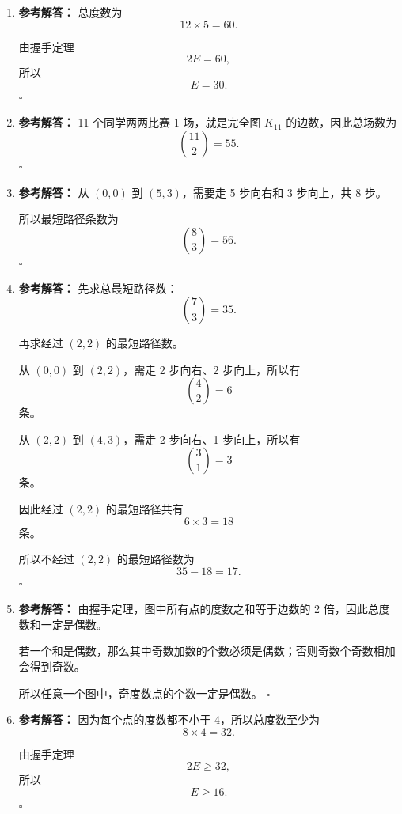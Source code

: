 \documentclass[11pt,a4paper,fontset=fandol]{ctexart}
\newenvironment{solution}{\par\noindent\textbf{参考解答：}}{\hfill$\square$\par}
\begin{document}
\begin{enumerate}
  \item \begin{solution}
  总度数为
  \[
  12\times 5=60.
  \]

  由握手定理
  \[
  2E=60,
  \]
  所以
  \[
  E=30.
  \]
  \end{solution}

  \item \begin{solution}
  11 个同学两两比赛 1 场，就是完全图 $K_{11}$ 的边数，因此总场数为
  \[
  \binom{11}{2}=55.
  \]
  \end{solution}

  \item \begin{solution}
  从 $(0,0)$ 到 $(5,3)$，需要走 5 步向右和 3 步向上，共 8 步。

  所以最短路径条数为
  \[
  \binom83=56.
  \]
  \end{solution}

  \item \begin{solution}
  先求总最短路径数：
  \[
  \binom73=35.
  \]

  再求经过 $(2,2)$ 的最短路径数。

  从 $(0,0)$ 到 $(2,2)$，需走 2 步向右、2 步向上，所以有
  \[
  \binom42=6
  \]
  条。

  从 $(2,2)$ 到 $(4,3)$，需走 2 步向右、1 步向上，所以有
  \[
  \binom31=3
  \]
  条。

  因此经过 $(2,2)$ 的最短路径共有
  \[
  6\times 3=18
  \]
  条。

  所以不经过 $(2,2)$ 的最短路径数为
  \[
  35-18=17.
  \]
  \end{solution}

  \item \begin{solution}
  由握手定理，图中所有点的度数之和等于边数的 2 倍，因此总度数和一定是偶数。

  若一个和是偶数，那么其中奇数加数的个数必须是偶数；否则奇数个奇数相加会得到奇数。

  所以任意一个图中，奇度数点的个数一定是偶数。
  \end{solution}

  \item \begin{solution}
  因为每个点的度数都不小于 4，所以总度数至少为
  \[
  8\times 4=32.
  \]

  由握手定理
  \[
  2E\ge 32,
  \]
  所以
  \[
  E\ge 16.
  \]
  \end{solution}


\end{enumerate}
\end{document}
